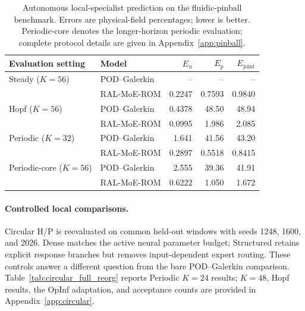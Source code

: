 \begin{table}[H]
\centering
\caption{
Autonomous local-specialist prediction on the fluidic-pinball benchmark. Errors are physical-field percentages; lower is better. Periodic-core denotes the longer-horizon periodic evaluation; complete protocol details are given in Appendix~\ref{app:pinball}.
}
\label{tab:pinball_autonomous}
\small
\setlength{\tabcolsep}{5pt}
\begin{tabular}{@{}llrrr@{}}
\toprule
Evaluation setting & Model & $E_u$ & $E_p$ & $E_{\mathrm{joint}}$ \\
\midrule
Steady ($K=56$)
& POD--Galerkin
& -- & -- & -- \\
& RAL-MoE-ROM
& 0.2247 & 0.7593 & 0.9840 \\
\addlinespace

Hopf ($K=56$)
& POD--Galerkin
& 0.4378 & 48.50 & 48.94 \\
& RAL-MoE-ROM
& 0.0995 & 1.986 & 2.085 \\
\addlinespace

Periodic ($K=32$)
& POD--Galerkin
& 1.641 & 41.56 & 43.20 \\
& RAL-MoE-ROM
& 0.2897 & 0.5518 & 0.8415 \\
\addlinespace

Periodic-core ($K=56$)
& POD--Galerkin
& 2.555 & 39.36 & 41.91 \\
& RAL-MoE-ROM
& 0.6222 & 1.050 & 1.672 \\
\bottomrule
\end{tabular}
\end{table}

\paragraph{Controlled local comparisons.}
Circular H/P is reevaluated on common held-out windows with seeds
1248, 1600, and 2026. Dense matches the active neural parameter
budget; Structured retains explicit response branches but removes
input-dependent expert routing. These controls answer a different
question from the bare POD--Galerkin comparison.
Table~\ref{tab:circular_full_reorg} reports Periodic $K=24$ results;
$K=48$, Hopf results, the OpInf adaptation, and acceptance counts
are provided in Appendix~\ref{app:circular}.

